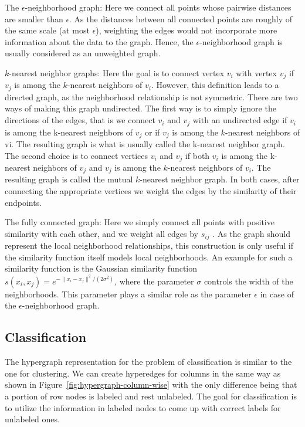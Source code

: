 The $\epsilon$-neighborhood graph: Here we connect all points whose pairwise distances are smaller than $\epsilon$. As the distances between all connected points are roughly of the same scale (at most $\epsilon$), weighting the edges would not incorporate more information about the data to the graph. Hence, the $\epsilon$-neighborhood graph is usually considered as an unweighted graph.

$k$-nearest neighbor graphs: Here the goal is to connect vertex $v_i$ with vertex $v_j$ if $v_j$ is among the $k$-nearest neighbors of $v_i$. However, this definition leads to a directed graph, as the neighborhood relationship is not symmetric. There are two ways of making this graph undirected. The first way is to simply ignore the directions of the edges, that is we connect $v_i$ and $v_j$ with an undirected edge if $v_i$ is among the k-nearest neighbors of $v_j$ or if $v_j$ is among the $k$-nearest neighbors of vi. The resulting graph is what is usually called the k-nearest neighbor graph. The second choice is to connect vertices $v_i$ and $v_j$ if both $v_i$ is among the k-nearest neighbors of $v_j$ and $v_j$ is among the $k$-nearest neighbors of $v_i$. The resulting graph is called the mutual $k$-nearest neighbor graph. In both cases, after connecting the appropriate vertices we weight the edges by the similarity of their endpoints.

The fully connected graph: Here we simply connect all points with positive similarity with each other, and we weight all edges by $s_{ij}$ . As the graph should represent the local neighborhood relationships, this construction is only useful if the similarity function itself models local neighborhoods. An example for such a similarity function is the Gaussian similarity function $s(x_i, x_j) = e^{-\|x_i - x_j\|^2/(2\sigma^2)}$, where the parameter $\sigma$ controls the width of the neighborhoods. This parameter plays a similar role as the parameter $\epsilon$ in case of the $\epsilon$-neighborhood graph.


\subsection{Classification}
\label{sec:classification}
The hypergraph representation for the problem of classification is similar to the one for clustering. We can create hyperedges for columns in the same way as shown in Figure~\ref{fig:hypergraph-column-wise} with the only difference being that a portion of row nodes is labeled and rest unlabeled. The goal for classification is to utilize the information in labeled nodes to come up with correct labels for unlabeled ones.

